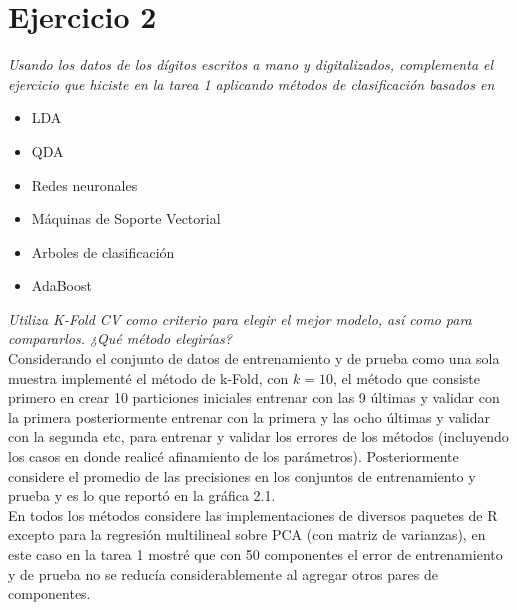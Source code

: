 \documentclass[paper=letter, fontsize=11pt]{scrartcl}
\numberwithin{equation}{section} %
\numberwithin{figure}{section} %
\numberwithin{table}{section} %
\begin{document}
\section{Ejercicio 2}
\textit{
Usando los datos de los dígitos escritos a mano y  digitalizados, complementa el ejercicio que hiciste en la tarea 1 aplicando métodos de clasificación basados en}
\begin{itemize}
\item LDA
\item QDA
\item Redes neuronales
\item Máquinas de Soporte Vectorial
\item Arboles de clasificación
\item AdaBoost
\end{itemize}
\textit{Utiliza K-Fold CV como criterio para elegir el mejor modelo, así como para compararlos. ¿Qué método elegirías?}\\

Considerando el conjunto de datos de entrenamiento y de prueba como una sola muestra implementé el método de k-Fold, con $k=10$, el método que consiste primero en crear 10 particiones iniciales entrenar con las 9 últimas y validar con la primera posteriormente entrenar con la primera y las ocho últimas y validar con la segunda etc, para entrenar y validar los errores de los métodos (incluyendo los casos en donde realicé afinamiento de los parámetros). Posteriormente considere el promedio de las precisiones en los conjuntos de entrenamiento  y prueba y es lo que reportó en la gráfica 2.1.\\

En todos los métodos considere las implementaciones de diversos paquetes de R excepto para la regresión multilineal sobre PCA (con matriz de varianzas), en este caso en la tarea 1 mostré que con 50 componentes el error de entrenamiento y de prueba no se reducía considerablemente al agregar otros pares de componentes.\\
\end{document}
